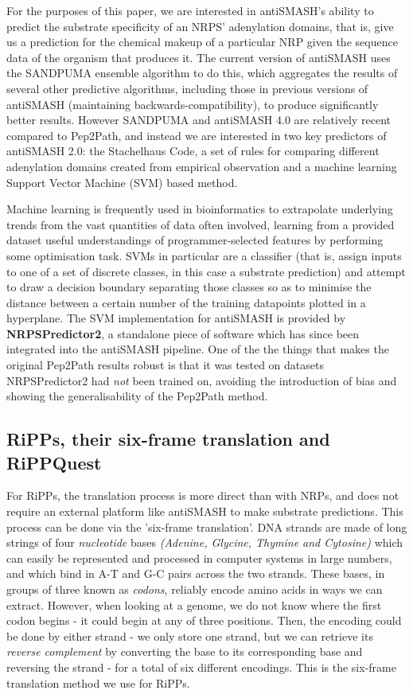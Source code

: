 \documentclass{l4proj}
\newcommand{\cit}[1]{\citep{#1}}
\begin{document}
For the purposes of this paper, we are interested in antiSMASH's ability to predict the substrate specificity of an NRPS' adenylation domains, that is, give us a prediction for the chemical makeup of a particular NRP given the sequence data of the organism that produces it. The current version of antiSMASH uses the SANDPUMA ensemble algorithm to do this, which aggregates the results of several other predictive algorithms, including those in previous versions of antiSMASH (maintaining backwards-compatibility), to produce significantly better results. However SANDPUMA and antiSMASH 4.0 are relatively recent compared to Pep2Path, and instead we are interested in two key predictors of antiSMASH 2.0: the Stachelhaus Code, a set of rules for comparing different adenylation domains created from empirical observation \cit{stachelhaus} and a machine learning Support Vector Machine (SVM) based method.

Machine learning is frequently used in bioinformatics to extrapolate underlying trends from the vast quantities of data often involved, learning from a provided dataset useful understandings of programmer-selected features by performing some optimisation task. SVMs in particular are a classifier (that is, assign inputs to one of a set of discrete classes, in this case a substrate prediction) and attempt to draw a decision boundary separating those classes so as to minimise the distance between a certain number of the training datapoints plotted in a hyperplane. The SVM implementation for antiSMASH is provided by \textbf{NRPSPredictor2}, \cit{nrps2} a standalone piece of software which has since been integrated into the antiSMASH pipeline. One of the the things that makes the original Pep2Path results robust is that it was tested on datasets NRPSPredictor2 had \textit{not} been trained on, avoiding the introduction of bias and showing the generalisability of the Pep2Path method.

\subsection{RiPPs, their six-frame translation and RiPPQuest} \label{ripps}

For RiPPs, the translation process is more direct than with NRPs, and does not require an external platform like antiSMASH to make substrate predictions. This process can be done via the 'six-frame translation'. DNA strands are made of long strings of four \textit{nucleotide} bases \textit{(Adenine, Glycine, Thymine and Cytosine)} which can easily be represented and processed in computer systems in large numbers, and which bind in A-T and G-C pairs across the two strands. These bases, in groups of three known as \textit{codons}, reliably encode amino acids in ways we can extract. However, when looking at a genome, we do not know where the first codon begins - it could begin at any of three positions. Then, the encoding could be done by either strand - we only store one strand, but we can retrieve its \textit{reverse complement} by converting the base to its corresponding base and reversing the strand - for a total of six different encodings. This is the six-frame translation method we use for RiPPs.
\end{document}
